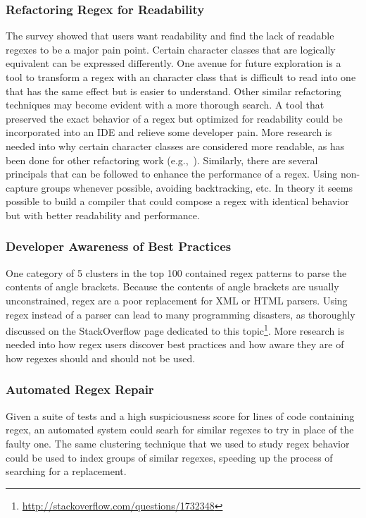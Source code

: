 \subsubsection{Refactoring Regex for Readability}
The survey showed that users want readability and find the lack of readable regexes to be a major pain point.  Certain character classes that are logically equivalent can be expressed differently.  One avenue for future exploration is a tool to transform a regex with an character class that is difficult to read into one that has the same effect but is easier to understand.
Other similar refactoring techniques may become evident with a more thorough search.  A tool that preserved the exact behavior of a regex but optimized for readability could be incorporated into an IDE and relieve some developer pain.  More research is needed into why certain character classes are considered more readable, as has been done for other refactoring work (e.g.,~\cite{StoleeTSE2013}).
Similarly, there are several principals that can be followed to enhance the performance of a regex.  Using non-capture groups whenever possible, avoiding backtracking, etc.  In theory it seems possible to build a compiler that could compose a regex with identical behavior but with better readability and performance.

\subsubsection{Developer Awareness of Best Practices}
One category of 5 clusters in the top 100 contained regex patterns to parse the contents of angle brackets.  Because the contents of angle brackets are usually unconstrained, regex are a poor replacement for XML or HTML parsers.  Using regex instead of a parser can lead to many programming disasters, as thoroughly discussed on the StackOverflow page dedicated to this topic\footnote{\url{http://stackoverflow.com/questions/1732348}}.  More research is needed into how regex users discover best practices and how aware they are of how regexes should and should not be used.

\subsubsection{Automated Regex Repair}
Given a suite of tests and a high suspiciousness score for lines of code containing regex, an automated system could searh for similar regexes to try in place of the faulty one.  The same clustering technique that we used to study regex behavior could be used to index groups of similar regexes, speeding up the process of searching for a replacement.




